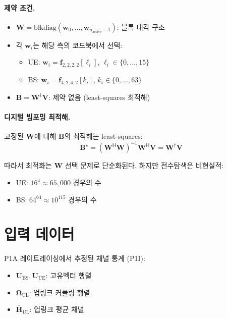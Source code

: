 \documentclass[10pt]{article}
\begin{document}
\paragraph{제약 조건.}
\begin{itemize}
    \item $\mathbf{W} = \text{blkdiag}(\mathbf{w}_0, \ldots, \mathbf{w}_{n_{\text{active}}-1})$: 블록 대각 구조
    \item 각 $\mathbf{w}_i$는 해당 측의 코드북에서 선택:
    \begin{itemize}
        \item UE: $\mathbf{w}_i = \mathbf{f}_{2,2,2,2}[\ell_i]$, $\ell_i \in \{0, \ldots, 15\}$
        \item BS: $\mathbf{w}_i = \mathbf{f}_{4,2,4,2}[k_i]$, $k_i \in \{0, \ldots, 63\}$
    \end{itemize}
    \item $\mathbf{B} = \mathbf{W}^{\dagger} \mathbf{V}$: 제약 없음 (least-squares 최적해)
\end{itemize}

\paragraph{디지털 빔포밍 최적해.}
고정된 $\mathbf{W}$에 대해 $\mathbf{B}$의 최적해는 least-squares:
\begin{equation}
\mathbf{B}^{\star} = (\mathbf{W}^{\mathsf{H}} \mathbf{W})^{-1} \mathbf{W}^{\mathsf{H}} \mathbf{V} = \mathbf{W}^{\dagger} \mathbf{V}
\end{equation}

따라서 최적화는 $\mathbf{W}$ 선택 문제로 단순화된다. 하지만 전수탐색은 비현실적:
\begin{itemize}
    \item UE: $16^4 \approx 65,000$ 경우의 수
    \item BS: $64^{64} \approx 10^{115}$ 경우의 수
\end{itemize}

\section{입력 데이터}

P1A 레이트레이싱에서 추정된 채널 통계 (P1I):
\begin{itemize}
    \item $\mathbf{U}_{\text{BS}}, \mathbf{U}_{\text{UE}}$: 고유벡터 행렬
    \item $\boldsymbol{\Omega}_{\text{UL}}$: 업링크 커플링 행렬
    \item $\bar{\mathbf{H}}_{\text{UL}}$: 업링크 평균 채널
\end{itemize}
\end{document}
